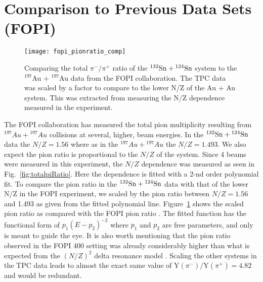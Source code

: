 \section{Comparison to Previous Data Sets (FOPI)}


\begin{figure}[!htb]
\centering
\texttt{[image: fopi\_pionratio\_comp]}
\caption{Comparing the total $\pi^-/\pi^+$ ratio of the ${}^{132}\mathrm{Sn} + {}^{124}\mathrm{Sn}$ system to the ${}^{197}$Au + ${}^{197}$Au data from the FOPI collaboration. The \spirit TPC data was scaled by a factor to compare to the lower N/Z of the Au + Au system. This was extracted from measuring the N/Z dependence measured in the experiment. }
\label{fig:fopiPionRatio}
\end{figure}

The FOPI collaboration has measured the total pion multiplicity resulting from ${}^{197}Au + {}^{197}Au$ collisions at several, higher, beam energies. In the ${}^{132}\mathrm{Sn} + {}^{124}\mathrm{Sn}$ data the $N/Z=1.56$ where as in the ${}^{197}Au + {}^{197}Au$ the $N/Z=1.493$. We also expect the pion ratio is proportional to the $N/Z$ of the system. Since 4 beams were measured in this experiment, the $N/Z$ dependence was measured as seen in Fig.~\ref{fig:totalpiRatio}. Here the dependence is fitted with a 2-nd order polynomial fit. To compare the pion ratio in the ${}^{132}\mathrm{Sn} + {}^{124}\mathrm{Sn}$ data with that of the lower N/Z in the FOPI experiment, we scaled by the pion ratio between $N/Z=1.56$ and 1.493 as given from the fitted polynomial line. Figure~\ref{fig:fopiPionRatio} shows the scaled pion ratio as compared with the FOPI pion ratio \cite{fopi}. The fitted function has the functional form of $p_1(E - p_2)^{-2}$ where $p_1$ and $p_2$ are free parameters, and only is meant to guide the eye. It is also worth mentioning that the pion ratio observed in the FOPI \SI{400}{\MeVA} setting was already considerably higher than what is expected from the $(N/Z)^2$ delta resonance model \cite{baoan_piprod1,baoan_piprod2}. Scaling the other systems in the \spirit TPC data leads to almost the exact same value of $\mathrm{Y}(\pi^-)/\mathrm{Y}(\pi^+) = \num{4.82}$ and would be redundant. 






